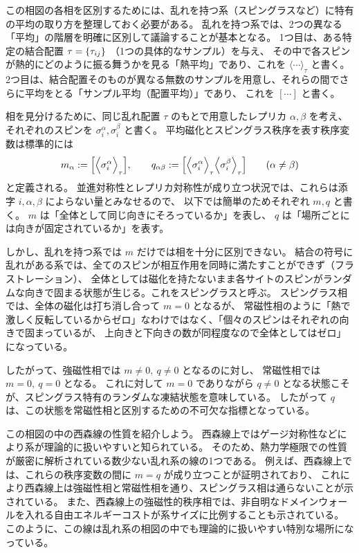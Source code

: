 \documentclass[../master.tex]{subfiles}
\begin{document}
この相図の各相を区別するためには、乱れを持つ系（スピングラスなど）に特有の平均の取り方を整理しておく必要がある。
乱れを持つ系では、2つの異なる「平均」の階層を明確に区別して議論することが基本となる。
1つ目は、ある特定の結合配置 $ \tau=\qty{\tau_{ij}} $ （1つの具体的なサンプル）を与え、
その中で各スピンが熱的にどのように振る舞うかを見る「熱平均」であり、これを $ \langle \cdots \rangle_{\tau} $ と書く。
2つ目は、結合配置そのものが異なる無数のサンプルを用意し、それらの間でさらに平均をとる「サンプル平均（配置平均）」であり、
これを $ [\cdots] $ と書く。

相を見分けるために、同じ乱れ配置 \(\tau\) のもとで用意したレプリカ \(\alpha,\beta\) を考え、
それぞれのスピンを \(\sigma_i^\alpha,\sigma_i^\beta\) と書く。
平均磁化とスピングラス秩序を表す秩序変数は標準的には
\begin{equation}
    m_\alpha := \qty[\Big\langle \sigma_i^\alpha \Big\rangle_\tau],
    \qquad
    q_{\alpha\beta} := \qty[\Big\langle \sigma_i^\alpha \Big\rangle_\tau \Big\langle \sigma_i^\beta \Big\rangle_\tau]
    \qquad (\alpha\neq\beta)
\end{equation}
と定義される。
並進対称性とレプリカ対称性が成り立つ状況では、これらは添字 \(i,\alpha,\beta\) によらない量とみなせるので、
以下では簡単のためそれぞれ \(m,q\) と書く。
\(m\) は「全体として同じ向きにそろっているか」を表し、
\(q\) は「場所ごとには向きが固定されているか」を表す。

しかし、乱れを持つ系では \(m\) だけでは相を十分に区別できない。
結合の符号に乱れがある系では、全てのスピンが相互作用を同時に満たすことができず（フラストレーション）、
全体としては磁化を持たないまま各サイトのスピンがランダムな向きで固まる状態が生じる。これをスピングラスと呼ぶ。
スピングラス相では、全体の磁化は打ち消し合って \(m=0\) となるが、
常磁性相のように「熱で激しく反転しているからゼロ」なわけではなく、「個々のスピンはそれぞれの向きで固まっているが、
上向きと下向きの数が同程度なので全体としてはゼロ」になっている。

したがって、強磁性相では \(m\neq 0,\ q\neq 0\) となるのに対し、
常磁性相では \(m=0,\ q=0\) となる。
これに対して \(m=0\) でありながら \(q\neq 0\) となる状態こそが、スピングラス特有のランダムな凍結状態を意味している。
したがって \(q\) は、この状態を常磁性相と区別するための不可欠な指標となっている。

この相図の中の西森線の性質を紹介しよう。
西森線上ではゲージ対称性などにより系が理論的に扱いやすいと知られている。
そのため、熱力学極限での性質が厳密に解析されている数少ない乱れ系の線の1つである。
例えば、西森線上では、これらの秩序変数の間に \(m=q\) が成り立つことが証明されており、
これにより西森線上は強磁性相と常磁性相を通り、スピングラス相は通らないことが示されている。
また、西森線上の強磁性的秩序相では、非自明なドメインウォールを入れる自由エネルギーコストが系サイズに比例することも示されている。
このように、この線は乱れ系の相図の中でも理論的に扱いやすい特別な場所になっている。
\end{document}
